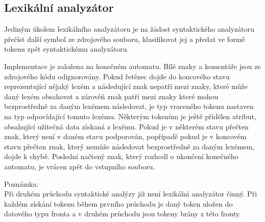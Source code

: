 \documentclass[a4paper, 11pt]{article}
\begin{document}
    \subsection{Lexikální analyzátor}
    Jediným úkolem lexikálního analyzátoru je na žádost syntaktického analyzátoru přečíst další symbol ze zdrojového souboru, klasifikovat jej a předat ve formě tokenu zpět syntaktickému analyzátoru.\par
    Implementace je založena na konečném automatu. Bílé znaky a komentáře jsou ze zdrojového kódu odignorovány. Pokud řetězec dojde do koncového stavu reprezentující nějaký lexém a následující znak nepatří mezi znaky, které může daný lexém obsahovat a zárověň znak patří mezi znaky které mohou bezprostředně za daným lexémem následovat, je typ vraceného tokenu nastaven na typ odpovídající tomuto lexému. Některým tokenům je ještě přidělen atribut, obsahující užitečná data získaná z lexému. Pokud je v některém stavu přečten znak, který není v daném stavu podporován, popřípadě pokud je v koncovém stavu přečten znak, který nemůže následovat bezprostředně za daným lexémem, dojde k chybě. Poslední načtený znak, který rozhodl o ukončení konečného automatu, je vrácen zpět do vstupního souboru.\par
    {\small Poznámka:\\
    Při druhém průchodu syntaktické analýzy již není lexikální analyzátor činný. Při každém získání tokenu během prvního průchodu je daný token uložen do datového typu fronta a v druhém průchodu jsou tokeny brány z této fronty.}
\end{document}
